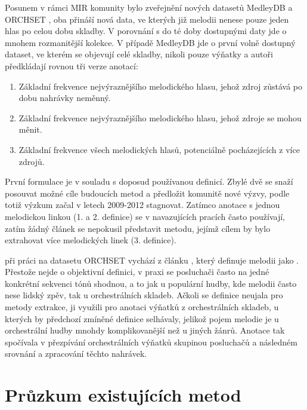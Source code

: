 Posunem v rámci MIR komunity bylo zveřejnění nových datasetů MedleyDB \citep{Bittner2014} a ORCHSET \citep{Bosch2016}, oba přináší nová data, ve kterých již melodii nenese pouze jeden hlas po celou dobu skladby. V porovnání s do té doby dostupnými daty jde o mnohem rozmanitější kolekce. V případě MedleyDB jde o první volně dostupný dataset, ve kterém se objevují celé skladby, nikoli pouze výňatky a autoři předkládají rovnou tři verze anotací:

\begin{enumerate}
    \item Základní frekvence nejvýraznějšího melodického hlasu, jehož zdroj zůstává po dobu nahrávky neměnný.
    \item Základní frekvence nejvýraznějšího melodického hlasu, jehož zdroje se mohou měnit.
    \item Základní frekvence všech melodických hlasů, potenciálně pocházejících z více zdrojů.
\end{enumerate}

První formulace je v souladu s doposud používanou definicí. Zbylé dvě se snaží posouvat možné cíle budoucích metod a předložit komunitě nové výzvy, podle \cite{Salamon2014} totiž výzkum začal v letech 2009-2012 stagnovat. Zatímco anotace s jednou melodickou linkou (1. a 2. definice) se v navazujících pracích často používají, zatím žádný článek se nepokusil představit metodu, jejímž cílem by bylo extrahovat více melodických linek (3. definice).

\cite{Bosch2016} při práci na datasetu ORCHSET vychází z článku \cite{Poliner2007}, který definuje melodii jako . Přestože nejde o objektivní definici, v praxi se posluchači často na jedné konkrétní sekvenci tónů shodnou, a to jak u populární hudby, kde melodii často nese lidský zpěv, tak u orchestrálních skladeb. Ačkoli se definice neujala pro metody extrakce, \cite{Bosch2016} ji využili pro anotaci výňatků z orchestrálních skladeb, u kterých by předchozí zmíněné definice selhávaly, jelikož pojem melodie je u orchestrální hudby mnohdy komplikovanější než u jiných žánrů. Anotace tak spočívala v přezpívání orchestrálních výňatků skupinou posluchačů a následném srovnání a zpracování těchto nahrávek.

\section{Průzkum existujících metod}

